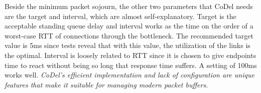Beside the minimum packet sojourn, the other two parameters that CoDel needs
are the target and interval, which are almost self-explanatory. Target is the
acceptable standing queue delay and interval works as the  time on the order
of a worst-case RTT of connections through the bottleneck. The recommended
target value is 5ms since tests reveal that with this value, the utilization
of the links is the optimal. Interval is loosely related to RTT since it is
chosen to give endpoints time to react without being so long that response
time suffers. A setting of 100ms works well. \textit{CoDel's efficient
implementation and lack of configuration are unique features that make it
suitable for managing modern packet buffers}\cite{NicholsJacobsonCQD}.

